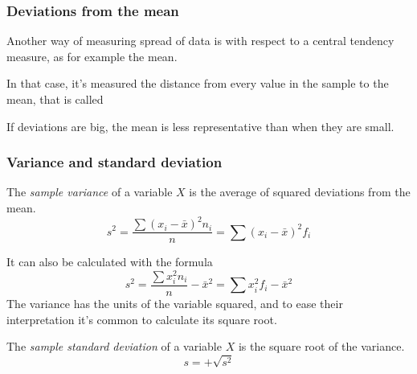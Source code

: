 \begin{frame}
\frametitle{Deviations from the mean}
Another way of measuring spread of data is with respect to a central tendency measure, as for example the mean. 

In that case, it's measured the distance from every value in the sample to the mean, that is called

\begin{center}
\scalebox{1}{}
\end{center}

If deviations are big, the mean is less representative than when they are small.
\end{frame}


\begin{frame}
\frametitle{Variance and standard deviation}
\begin{definition}
The \emph{sample variance} of a variable $X$ is the average of squared deviations from the mean. 
\[
s^2 = \frac{\sum (x_i-\bar x)^2n_i}{n} = \sum (x_i-\bar x)^2f_i
\]
\end{definition}
It can also be calculated with the formula
\[
s^2 = \frac{\sum x_i^2n_i}{n} -\bar x^2= \sum x_i^2f_i-\bar x^2
\]
The variance has the units of the variable squared, and to ease their interpretation it's common to calculate its square
root.

\begin{definition}
The \emph{sample standard deviation} of a variable $X$ is the square root of the variance.
\[
s = +\sqrt{s^2}
\]
\end{definition}
\end{frame}


